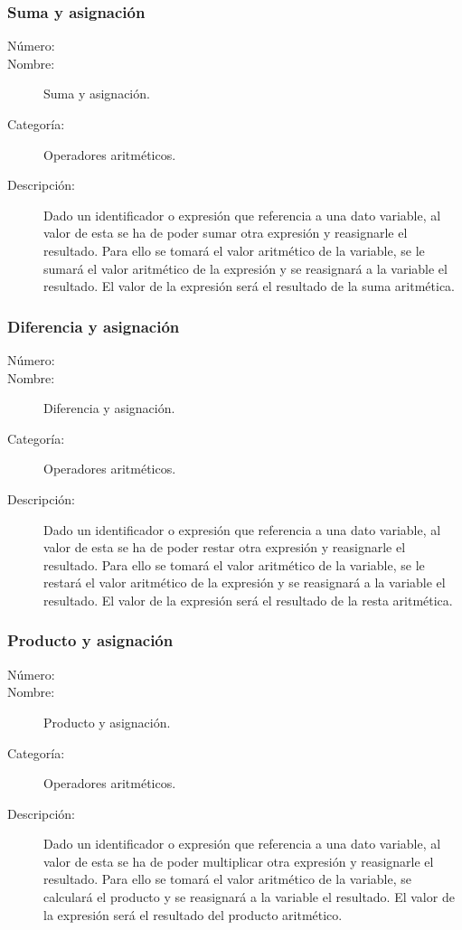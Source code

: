 \subsubsection{Suma y asignación}
\begin{framed}
	\begin{description}
		\item [Número:] \cn
		\item [Nombre:] Suma y asignación.
		\item [Categoría:] Operadores aritméticos.
		\item [Descripción:] Dado un identificador o expresión que referencia a una dato variable, al valor de esta se ha de poder sumar otra expresión
		y reasignarle el resultado. Para ello se tomará el valor aritmético de la variable, se le sumará el valor aritmético de la expresión
		y se reasignará a la variable el resultado. El valor de la expresión será el resultado de la suma aritmética.
	\end {description}
\end{framed}

\subsubsection{Diferencia y asignación}
\begin{framed}
	\begin{description}
		\item [Número:] \cn
		\item [Nombre:] Diferencia y asignación.
		\item [Categoría:] Operadores aritméticos.
		\item [Descripción:] Dado un identificador o expresión que referencia a una dato variable, al valor de esta se ha de poder restar otra expresión
		y reasignarle el resultado. Para ello se tomará el valor aritmético de la variable, se le restará el valor aritmético de la expresión
		y se reasignará a la variable el resultado. El valor de la expresión será el resultado de la resta aritmética.
	\end {description}
\end{framed}

\subsubsection{Producto y asignación}
\begin{framed}
	\begin{description}
		\item [Número:] \cn
		\item [Nombre:] Producto y asignación.
		\item [Categoría:] Operadores aritméticos.
		\item [Descripción:] Dado un identificador o expresión que referencia a una dato variable, al valor de esta se ha de poder multiplicar
		otra expresión y reasignarle el resultado. Para ello se tomará el valor aritmético de la variable, se calculará el producto  y se reasignará a la variable el resultado. El valor de la expresión será el resultado del producto aritmético.
	\end {description}
\end{framed}

